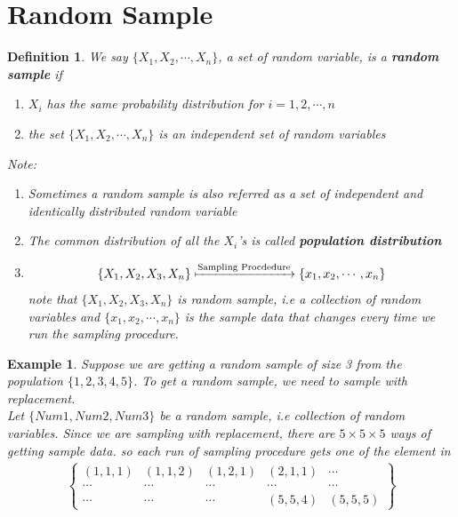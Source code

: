 \documentclass[11pt,oneside]{book}
\theoremstyle{newStyle}
\newtheorem{defn}[thm]{Definition}
\newtheorem{ex}{Example}[section]
\newcommand{\note}{\color{red}Note: \color{black}}
\begin{document}
\section[Random Sample]{Random Sample}
\begin{defn}
We say $\{X_1,X_2,\cdots,X_n\}$, a set of random variable, is a \textbf{random sample} if \begin{enumerate}
[label=(\roman*)]
\item $X_i$ has the same probability distribution for $i=1,2,\cdots,n$
\item the set $\{X_1,X_2,\cdots,X_n\}$ is an independent set of random variables
\end{enumerate}
\note \begin{enumerate}
\item Sometimes a random sample is also referred as a set of independent and identically distributed random variable
\item The common distribution of all the $X_i$'s is called \textbf{population distribution}
\item $$\{X_1,X_2,X_3,X_n\}\xmapsto{\text{Sampling Procdedure}} \{x_1,x_2,\cdots,x_n\}$$ note that $\{X_1,X_2,X_3,X_n\}$ is random sample, i.e a collection of random variables and $\{x_1,x_2,\cdots,x_n\}$ is the sample data that changes every time we run the sampling procedure.
\end{enumerate}
\end{defn}
\begin{ex}
Suppose we are getting a random sample of size 3 from the population $\{1,2,3,4,5\}$. To get a random sample, we need to sample with replacement. \\
Let $\{Num1,Num2,Num3\}$ be a random sample, i.e collection of random variables. Since we are sampling with replacement, there are $5\times 5 \times 5$ ways of getting sample data. so each run of sampling procedure gets one of the element in \begin{align*}
\begin{Bmatrix}
(1,1,1) & (1,1,2) & (1,2,1) &(2,1,1) &\cdots\\
\cdots & \cdots & \cdots& \cdots&\cdots\\
\cdots &\cdots&\cdots&(5,5,4) &(5,5,5)
\end{Bmatrix}
\end{align*}
\end{ex}
\end{document}
